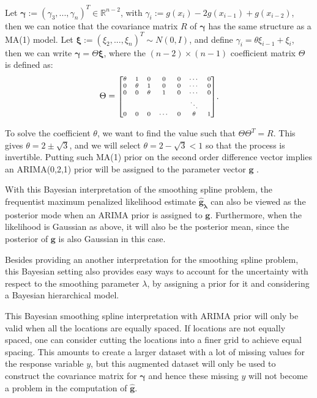 \documentclass{article}
\begin{document}
Let $\boldsymbol \gamma:=(\gamma_3,...,\gamma_n)^T \in \mathbb{R}^{n-2}$, with $\gamma_i :=g(x_i)-2g(x_{i-1})+g(x_{i-2})$, then we can notice that the covariance matrix $R$ of $\boldsymbol \gamma$ has the same structure as a MA(1) model. Let $\boldsymbol \xi :=(\xi_2,...,\xi_n)^T \sim N(0, I)$, and define $\gamma_i = \theta\xi_{i-1} +\xi_i$, then we can write $\boldsymbol \gamma = \Theta \boldsymbol \xi$, where the $(n-2)\times(n-1)$ coefficient matrix $\Theta$ is defined as:
\begin{equation}
\begin{aligned}
\Theta = \mbox{\scriptsize $\begin{bmatrix}
\theta & 1 & 0 & 0 & 0 & \cdots & 0\\
0 & \theta & 1 & 0 & 0 & \cdots & 0\\
0 & 0 & \theta & 1 & 0 & \cdots & 0\\
 &  &  &  &  & \ddots & \\
0 & 0 & 0 & \cdots & 0 & \theta & 1\\
\end{bmatrix}$}
\end{aligned}.
\end{equation}

To solve the coefficient $\theta$, we want to find the value such that $\Theta\Theta^T=R$. This gives $\theta = 2 \pm \sqrt{3}$, and we will select $\theta=2-\sqrt3 <1$ so that the process is invertible. Putting such MA(1) prior on the second order difference vector implies an ARIMA(0,2,1) prior will be assigned to the parameter vector $\boldsymbol g$ \citep{ARIMA}.

With this Bayesian interpretation of the smoothing spline problem, the frequentist maximum penalized likelihood estimate $\boldsymbol{\hat{g}_\lambda}$ can also be viewed as the posterior mode when an ARIMA prior is assigned to $\boldsymbol g$. Furthermore, when the likelihood is Gaussian as above, it will also be the posterior mean, since the posterior of $\boldsymbol g$ is also Gaussian in this case.

Besides providing an another interpretation for the smoothing spline problem, this Bayesian setting also provides easy ways to account for the uncertainty with respect to the smoothing parameter $\lambda$, by assigning a prior for it and considering a Bayesian hierarchical model. 

This Bayesian smoothing spline interpretation with ARIMA prior will only be valid when all the locations are equally spaced. If locations are not equally spaced, one can consider cutting the locations into a finer grid to achieve equal spacing. This amounts to create a larger dataset with a lot of missing values for the response variable $y$, but this augmented dataset will only be used to construct the covariance matrix for $\boldsymbol{\gamma}$ and hence these missing $y$ will not become a problem in the computation of $\hat{\boldsymbol{g}}$.
\end{document}

